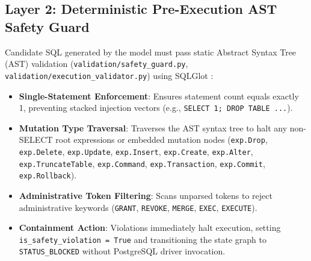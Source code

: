 \documentclass[conference]{IEEEtran}
\begin{document}
\subsection{Layer 2: Deterministic Pre-Execution AST Safety Guard}
Candidate SQL generated by the model must pass static Abstract Syntax Tree (AST) validation (\texttt{validation/safety\_guard.py}, \texttt{validation/execution\_validator.py}) using SQLGlot \cite{mao2023sqlglot}:
\begin{itemize}
    \item \textbf{Single-Statement Enforcement}: Ensures statement count equals exactly 1, preventing stacked injection vectors (e.g., \texttt{SELECT 1; DROP TABLE ...}).
    \item \textbf{Mutation Type Traversal}: Traverses the AST syntax tree to halt any non-SELECT root expressions or embedded mutation nodes (\texttt{exp.Drop}, \texttt{exp.Delete}, \texttt{exp.Update}, \texttt{exp.Insert}, \texttt{exp.Create}, \texttt{exp.Alter}, \texttt{exp.TruncateTable}, \texttt{exp.Command}, \texttt{exp.Transaction}, \texttt{exp.Commit}, \texttt{exp.Rollback}).
    \item \textbf{Administrative Token Filtering}: Scans unparsed tokens to reject administrative keywords (\texttt{GRANT}, \texttt{REVOKE}, \texttt{MERGE}, \texttt{EXEC}, \texttt{EXECUTE}).
    \item \textbf{Containment Action}: Violations immediately halt execution, setting \texttt{is\_safety\_violation = True} and transitioning the state graph to \texttt{STATUS\_BLOCKED} without PostgreSQL driver invocation.
\end{itemize}
\end{document}
